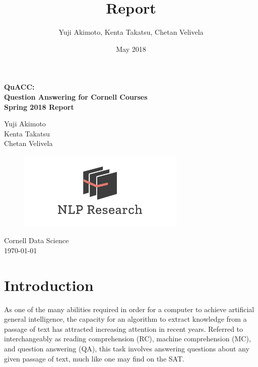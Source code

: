 \documentclass{article}
\title{Report}
\author{Yuji Akimoto, Kenta Takatsu, Chetan Velivela}
\date{May 2018}
\begin{document}
\begin{titlepage}
    \begin{center}
        \vspace*{1cm}
        
        \textbf{
            \LARGE{QuACC: \\ Question Answering for Cornell Courses} \\
            \vspace{0.5cm}
            \large{Spring 2018 Report}
        }
        
        \vspace{1.5cm}
        Yuji Akimoto \\
        Kenta Takatsu \\
        Chetan Velivela
        
        \vspace{4cm}
        \begin{figure}[h]
            \includegraphics[width=8cm]{nlp_research.png}
            \centering
        \end{figure}
        
        \vfill
        Cornell Data Science \\
        \today
        
    \end{center}
\end{titlepage}

\section{Introduction}
As one of the many abilities required in order for a computer to achieve artificial general intelligence, the capacity for an algorithm to extract knowledge from a passage of text has attracted increasing attention in recent years. Referred to interchangeably as reading comprehension (RC), machine comprehension (MC), and question answering (QA), this task involves answering questions about any given passage of text, much like one may find on the SAT. \\
\end{document}
